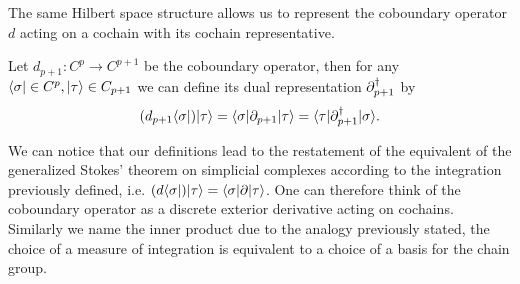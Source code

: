 \documentclass[../1.tex]{subfiles}
\begin{document}
    The same Hilbert space structure allows us to represent the coboundary operator $d$ acting on a cochain with its cochain representative.

    \begin{defn}
        Let $d_{p+1} : C^p \to C^{p+1}$ be the coboundary operator, then for any \\ $\langle \sigma | \in C^p, | \tau \rangle \in C_{p+1}$ we can define its dual representation $\partial^\dagger_{p+1}$ by
        \[(d_{p+1}\langle \sigma |)| \tau \rangle = \langle \sigma | \partial_{p+1} | \tau \rangle = \langle \tau | \partial^\dagger_{p+1} | \sigma \rangle .\]
    \end{defn}

    We can notice that our definitions lead to the restatement of the equivalent of the generalized Stokes' theorem on simplicial complexes
    according to the integration previously defined, i.e. $(d\langle \sigma |)| \tau \rangle = \langle \sigma |\partial| \tau \rangle$. One can therefore think of the coboundary
    operator as a discrete exterior derivative acting on cochains. Similarly we name the inner product  due to the analogy previously stated, the
    choice of a measure of integration is equivalent to a choice of a basis for the chain group.
\end{document}

